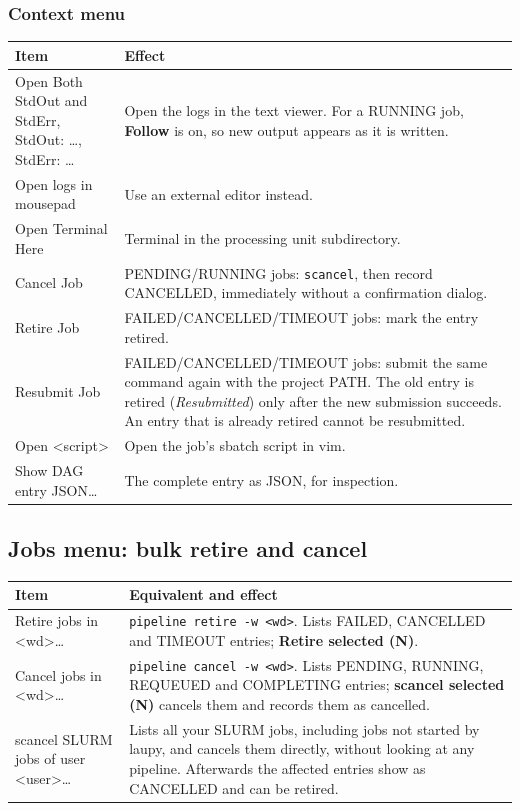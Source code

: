 \documentclass[11pt,a4paper]{article}
\newcommand{\cmd}[1]{\texttt{#1}}
\newcommand{\ui}[1]{\textsf{\textbf{#1}}}
\newcommand{\menu}[1]{\textsf{#1}}
\begin{document}
\subsubsection*{Context menu}

\begin{center}
\begin{tabularx}{\linewidth}{@{}l>{\raggedright\arraybackslash}X@{}}
\toprule
Item & Effect \\
\midrule
\menu{Open Both StdOut and StdErr}, \menu{StdOut: \ldots}, \menu{StdErr: \ldots} & Open the logs in the text viewer. For a RUNNING job, \ui{Follow} is on, so new output appears as it is written. \\
\menu{Open logs in mousepad} & Use an external editor instead. \\
\menu{Open Terminal Here} & Terminal in the processing unit subdirectory. \\
\menu{Cancel Job} & PENDING/RUNNING jobs: \cmd{scancel}, then record CANCELLED, immediately without a confirmation dialog. \\
\menu{Retire Job} & FAILED/CANCELLED/TIMEOUT jobs: mark the entry retired. \\
\menu{Resubmit Job} & FAILED/CANCELLED/TIMEOUT jobs: submit the same command again with the project PATH. The old entry is retired (\emph{Resubmitted}) only after the new submission succeeds. An entry that is already retired cannot be resubmitted. \\
\menu{Open <script>} & Open the job's sbatch script in vim. \\
\menu{Show DAG entry JSON\ldots} & The complete entry as JSON, for inspection. \\
\bottomrule
\end{tabularx}
\end{center}

\subsection{Jobs menu: bulk retire and cancel}\label{sec:jobs}

\begin{center}
\begin{tabularx}{\linewidth}{@{}l>{\raggedright\arraybackslash}X@{}}
\toprule
Item & Equivalent and effect \\
\midrule
\menu{Retire jobs in <wd>\ldots} & \cmd{pipeline retire -w <wd>}. Lists FAILED, CANCELLED and TIMEOUT entries; \ui{Retire selected (N)}. \\
\menu{Cancel jobs in <wd>\ldots} & \cmd{pipeline cancel -w <wd>}. Lists PENDING, RUNNING, REQUEUED and COMPLETING entries; \ui{scancel selected (N)} cancels them and records them as cancelled. \\
\menu{scancel SLURM jobs of user <user>\ldots} & Lists all your SLURM jobs, including jobs not started by laupy, and cancels them directly, without looking at any pipeline. Afterwards the affected entries show as CANCELLED and can be retired. \\
\bottomrule
\end{tabularx}
\end{center}
\end{document}
